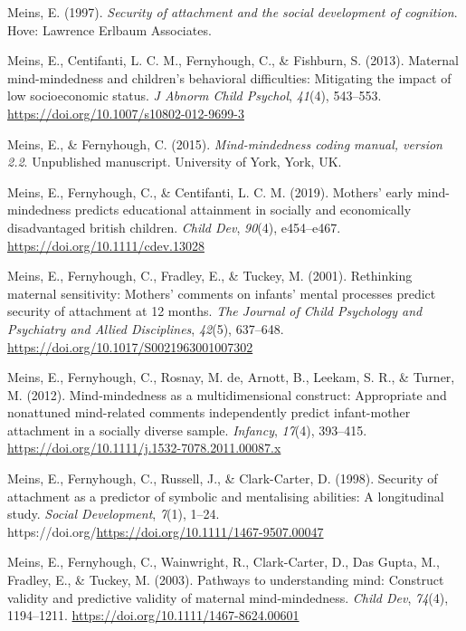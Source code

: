 \documentclass[
]{article}
\newlength{\cslhangindent}
\newlength{\cslentryspacingunit} %
\newenvironment{CSLReferences}[2] %
 {%
  \setlength{\parindent}{0pt}
  \ifodd #1
  \let\oldpar\par
  \def\par{\hangindent=\cslhangindent\oldpar}
  \fi
  \setlength{\parskip}{#2\cslentryspacingunit}
 }%
 {}
\begin{document}
\begin{CSLReferences}{1}{0}
\leavevmode{}%
Meins, E. (1997). \emph{Security of attachment and the social development of cognition}. Hove: Lawrence Erlbaum Associates.

\leavevmode{}%
Meins, E., Centifanti, L. C. M., Fernyhough, C., \& Fishburn, S. (2013). Maternal mind-mindedness and children's behavioral difficulties: Mitigating the impact of low socioeconomic status. \emph{J Abnorm Child Psychol}, \emph{41}(4), 543--553. \url{https://doi.org/10.1007/s10802-012-9699-3}

\leavevmode{}%
Meins, E., \& Fernyhough, C. (2015). \emph{Mind-mindedness coding manual, version 2.2}. Unpublished manuscript. University of York, York, UK.

\leavevmode{}%
Meins, E., Fernyhough, C., \& Centifanti, L. C. M. (2019). Mothers' early mind-mindedness predicts educational attainment in socially and economically disadvantaged british children. \emph{Child Dev}, \emph{90}(4), e454--e467. \url{https://doi.org/10.1111/cdev.13028}

\leavevmode{}%
Meins, E., Fernyhough, C., Fradley, E., \& Tuckey, M. (2001). Rethinking maternal sensitivity: Mothers' comments on infants' mental processes predict security of attachment at 12 months. \emph{The Journal of Child Psychology and Psychiatry and Allied Disciplines}, \emph{42}(5), 637--648. \url{https://doi.org/10.1017/S0021963001007302}

\leavevmode{}%
Meins, E., Fernyhough, C., Rosnay, M. de, Arnott, B., Leekam, S. R., \& Turner, M. (2012). Mind-mindedness as a multidimensional construct: Appropriate and nonattuned mind-related comments independently predict infant-mother attachment in a socially diverse sample. \emph{Infancy}, \emph{17}(4), 393--415. \url{https://doi.org/10.1111/j.1532-7078.2011.00087.x}

\leavevmode{}%
Meins, E., Fernyhough, C., Russell, J., \& Clark-Carter, D. (1998). Security of attachment as a predictor of symbolic and mentalising abilities: A longitudinal study. \emph{Social Development}, \emph{7}(1), 1--24. https://doi.org/\url{https://doi.org/10.1111/1467-9507.00047}

\leavevmode{}%
Meins, E., Fernyhough, C., Wainwright, R., Clark-Carter, D., Das Gupta, M., Fradley, E., \& Tuckey, M. (2003). Pathways to understanding mind: Construct validity and predictive validity of maternal mind-mindedness. \emph{Child Dev}, \emph{74}(4), 1194--1211. \url{https://doi.org/10.1111/1467-8624.00601}


\end{CSLReferences}
\end{document}

